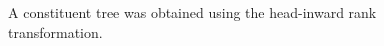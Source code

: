 \documentclass[../../document.tex]{subfiles}
\begin{document}
    \begin{figure}
        \centering
        
        \caption{\label{fig:ex:head-inward}
            A constituent tree was obtained using the head-inward rank transformation.
        }
    \end{figure}
\end{document}
